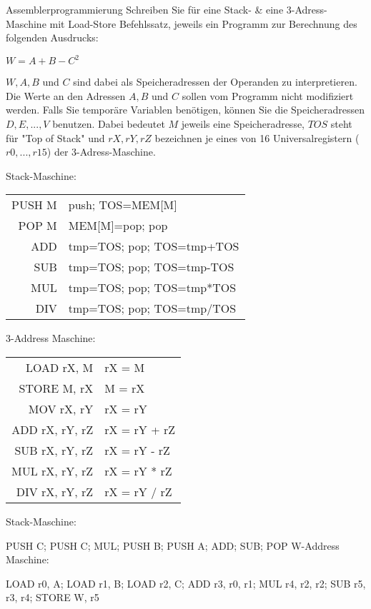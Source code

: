 \documentclass{exercisesheet}
\begin{document}
\begin{exercise}{Assemblerprogrammierung}
  Schreiben Sie für eine Stack- \& eine 3-Adress-Maschine mit Load-Store Befehlssatz, jeweils ein Programm zur Berechnung des folgenden Ausdrucks:\points[8]\par
  \begin{center}$W = A + B - C^2$\end{center}
  $W, A, B$ und $C$ sind dabei als Speicheradressen der Operanden zu interpretieren. Die Werte an den Adressen $A, B$ und $C$ sollen vom Programm nicht modifiziert werden. Falls Sie temporäre Variablen benötigen, können Sie die Speicheradressen $D, E, ..., V$ benutzen. Dabei bedeutet $M$ jeweils eine Speicheradresse, $TOS$ steht für "Top of Stack" und $rX, rY, rZ$ bezeichnen je eines von 16 Universalregistern ($r0, ..., r15$) der 3-Adress-Maschine.

  \begin{multicols}{2}
    Stack-Maschine:\par
    \begin{tabular}{|r|l|}
      \hline
      PUSH M & push; TOS=MEM[M]          \\
      POP M  & MEM[M]=pop; pop           \\
      ADD    & tmp=TOS; pop; TOS=tmp+TOS \\
      SUB    & tmp=TOS; pop; TOS=tmp-TOS \\
      MUL    & tmp=TOS; pop; TOS=tmp*TOS \\
      DIV    & tmp=TOS; pop; TOS=tmp/TOS \\
      \hline
    \end{tabular}
    \columnbreak

    3-Address Maschine:\par
    \begin{tabular}{|r|l|}
      \hline
      LOAD rX, M     & rX = M       \\
      STORE M, rX    & M = rX       \\
      MOV rX, rY     & rX = rY      \\
      ADD rX, rY, rZ & rX = rY + rZ \\
      SUB rX, rY, rZ & rX = rY - rZ \\
      MUL rX, rY, rZ & rX = rY * rZ \\
      DIV rX, rY, rZ & rX = rY / rZ \\
      \hline
    \end{tabular}
  \end{multicols}

  \begin{solution}
    Stack-Maschine:\par PUSH C; PUSH C; MUL; PUSH B; PUSH A; ADD; SUB; POP W-Address Maschine:\par LOAD r0, A; LOAD r1, B; LOAD r2, C; ADD r3, r0, r1; MUL r4, r2, r2;  SUB r5, r3, r4; STORE W, r5
  \end{solution}
\end{exercise}
\end{document}
